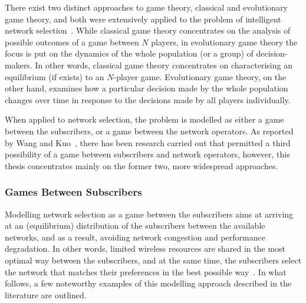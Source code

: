 There exist two distinct approaches to game theory, classical and evolutionary game theory, and both were extensively applied to the problem of intelligent network selection~\cite{LushengKuo2013}. While classical game theory concentrates on the analysis of possible outcomes of a game between $N$ players, in evolutionary game theory the focus is put on the dynamics of the whole population (or a group) of decision-makers. In other words, classical game theory concentrates on characterising an equilibrium (if exists) to an $N$-player game. Evolutionary game theory, on the other hand, examines how a particular decision made by the whole population changes over time in response to the decisions made by all players individually.

When applied to network selection, the problem is modelled as either a game between the subscribers, or a game between the network operators. As reported by Wang and Kuo~\cite{LushengKuo2013}, there has been research carried out that permitted a third possibility of a game between subscribers and network operators, however, this thesis concentrates mainly on the former two, more widespread approaches.

\subsubsection{Games Between Subscribers} %
\label{ssub:games_between_subscribers}
Modelling network selection as a game between the subscribers aims at arriving at an (equilibrium) distribution of the subscribers between the available networks, and as a result, avoiding network congestion and performance degradation. In other words, limited wireless resources are shared in the most optimal way between the subscribers, and at the same time, the subscribers select the network that matches their preferences in the best possible way~\cite{Niyato09}. In what follows, a few noteworthy examples of this modelling approach described in the literature are outlined.

